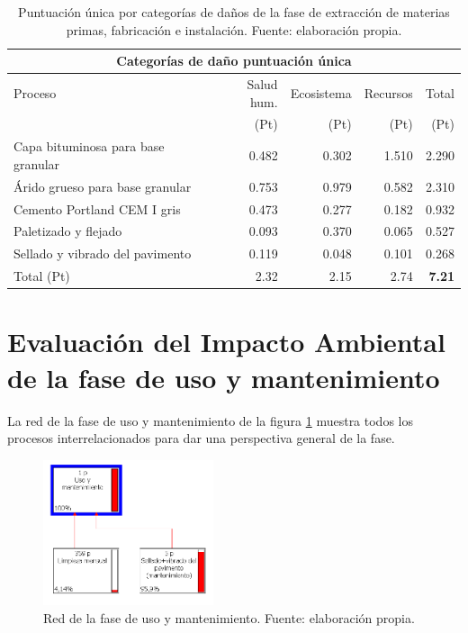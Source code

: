 \begin{table}[!htb]
\centering
\begin{tabular}{p{6cm}rrrr}
\toprule
\multicolumn{5}{c}{Categorías de daño puntuación única}\\
\midrule
Proceso & Salud hum. & Ecosistema & Recursos & Total\\
 & (Pt) & (Pt) &  (Pt) & (Pt)\\
\midrule
Capa bituminosa para base granular & 0.482 & 0.302 & 1.510 & 2.290\\
Árido grueso para base granular & 0.753 & 0.979 & 0.582 & 2.310\\
Cemento Portland CEM I gris & 0.473 & 0.277 & 0.182 & 0.932\\
Paletizado y flejado & 0.093 & 0.370 & 0.065 & 0.527\\
Sellado y vibrado del pavimento & 0.119 & 0.048 & 0.101 & 0.268\\
\midrule
Total (Pt) & 2.32 & 2.15 & 2.74 & \textbf{7.21}\\
\bottomrule
\end{tabular}
\caption[Puntuación única por categorías de daños de la fase de extracción de materias primas, fabricación e instalación.]{Puntuación única por categorías de daños de la fase de extracción de materias primas, fabricación e instalación. Fuente: elaboración propia.}
\label{categoriasdanosfabricacion}
\end{table}

\section{Evaluación del Impacto Ambiental de la fase de uso y mantenimiento}

La red de la fase de uso y mantenimiento de la figura \ref{fig:uso_red} muestra todos los procesos interrelacionados para dar una perspectiva general de la fase.

\begin{figure}[!htb]
\centering
\includegraphics[width=5cm]{img/uso_red.png}
\caption[Red de la fase de uso y mantenimiento.]{Red de la fase de uso y mantenimiento. Fuente: elaboración propia.}
\label{fig:uso_red}
\end{figure}

